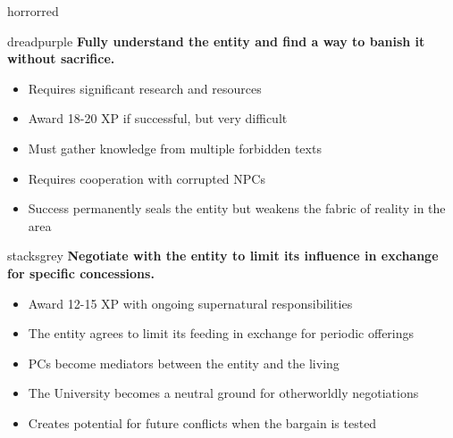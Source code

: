 \documentclass[11pt]{article}
\begin{document}
\begin{campaignsection}{horrorred}
\begin{clockbox}{dreadpurple}
\textbf{Fully understand the entity and find a way to banish it without sacrifice.}
\begin{itemize}
    \item Requires significant research and resources
    \item Award 18-20 XP if successful, but very difficult
    \item Must gather knowledge from multiple forbidden texts
    \item Requires cooperation with corrupted NPCs
    \item Success permanently seals the entity but weakens the fabric of reality in the area
\end{itemize}
\end{clockbox}

\begin{clockbox}{stacksgrey}
\textbf{Negotiate with the entity to limit its influence in exchange for specific concessions.}
\begin{itemize}
    \item Award 12-15 XP with ongoing supernatural responsibilities
    \item The entity agrees to limit its feeding in exchange for periodic offerings
    \item PCs become mediators between the entity and the living
    \item The University becomes a neutral ground for otherworldly negotiations
    \item Creates potential for future conflicts when the bargain is tested
\end{itemize}
\end{clockbox}
\end{campaignsection}

\newpage
\end{document}
